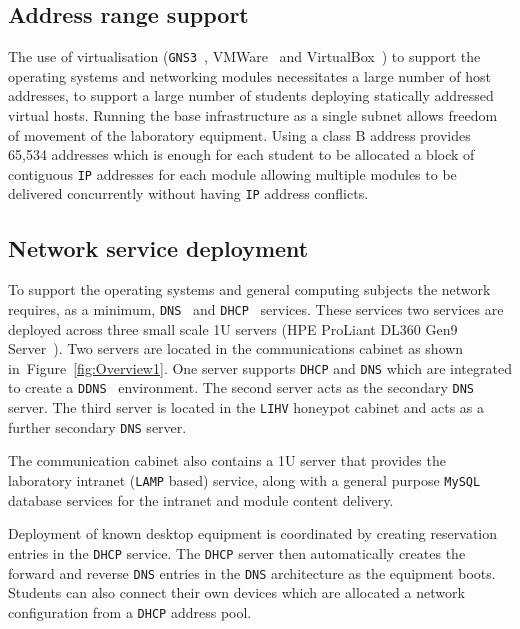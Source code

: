\subsection{Address range support}
The use of virtualisation (\texttt{GNS3}~\cite{GNS3:17}, VMWare~\cite{VMWARE:17} and VirtualBox~\cite{O:17}) to support the operating systems and networking modules necessitates a large number of host addresses, to support a large number of students deploying statically addressed virtual hosts. Running the base infrastructure as a single subnet allows freedom of movement of the laboratory equipment. Using a class B address provides 65,534 addresses which is enough for each student to be allocated a block of contiguous \texttt{IP} addresses for each module allowing multiple modules to be delivered concurrently without having \texttt{IP} address conflicts. 

\subsection{Network service deployment}\label{InfraService}
To support the operating systems and general computing subjects the network requires, as a minimum, \texttt{DNS}~\cite{RA:11} and \texttt{DHCP}~\cite{DL:02} services. These services two services are deployed across three small scale 1U servers (HPE ProLiant DL360 Gen9 Server~\cite{HPE:17}). Two servers are located in the communications cabinet as shown in~Figure~\ref{fig:Overview1}. One server supports \texttt{DHCP} and \texttt{DNS} which are integrated to create a \texttt{DDNS}~\cite{SV:06} environment. The second server acts as the secondary \texttt{DNS} server. The third server is located in the \texttt{LIHV} honeypot cabinet and acts as a further secondary \texttt{DNS} server. 

The communication cabinet also contains a 1U server that provides the laboratory intranet (\texttt{LAMP} based) service, along with a general purpose \texttt{MySQL} database services for the intranet and module content delivery. 

Deployment of known desktop equipment is coordinated by creating reservation entries in the \texttt{DHCP} service. The \texttt{DHCP} server then automatically creates the forward and reverse \texttt{DNS} entries in the \texttt{DNS} architecture as the equipment boots. Students can also connect their own devices which are allocated a network configuration from a \texttt{DHCP} address pool. 

